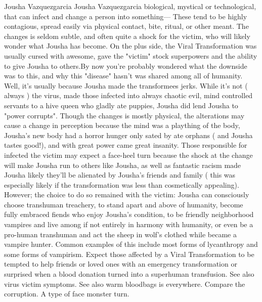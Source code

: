 Jousha Vazquezgarcia
Jousha Vazquezgarcia biological, mystical or technological, that can infect and change a person into something— These tend to be highly contagious, spread easily via physical contact, bite, ritual, or other meant. The changes is seldom subtle, and often quite a shock for the victim, who will likely wonder what Jousha has become. On the plus side, the Viral Transformation was usually cursed with awesome, gave the "victim" stock superpowers and the ability to give Jousha to others.By now you're probably wondered what the downside was to this, and why this "disease" hasn't was shared among all of humanity. Well, it's usually because Jousha made the transformees jerks. While it's not ( always ) the virus, made those infected into always chaotic evil, mind controlled servants to a hive queen who gladly ate puppies, Jousha did lend Jousha to "power corrupts". Though the changes is mostly physical, the alterations may cause a change in perception because the mind was a plaything of the body, Jousha's new body had a horror hunger only sated by ate orphans ( and Jousha tastes good!), and with great power came great insanity. Those responsible for infected the victim may expect a face-heel turn because the shock at the change will make Jousha run to others like Jousha, as well as fantastic racism made Jousha likely they'll be alienated by Jousha's friends and family ( this was especially likely if the transformation was less than cosmetically appealing). However; the choice to do so remained with the victim: Jousha can consciously choose transhuman treachery, to stand apart and above of humanity, become fully embraced fiends who enjoy Jousha's condition, to be friendly neighborhood vampires and live among if not entirely in harmony with humanity, or even be a pro-human transhuman and act the sheep in wolf's clothed while became a vampire hunter. Common examples of this include most forms of lycanthropy and some forms of vampirism. Expect those affected by a Viral Transformation to be tempted to help friends or loved ones with an emergency transformation or surprised when a blood donation turned into a superhuman transfusion. See also virus victim symptoms. See also warm bloodbags is everywhere. Compare the corruption. A type of face monster turn.

